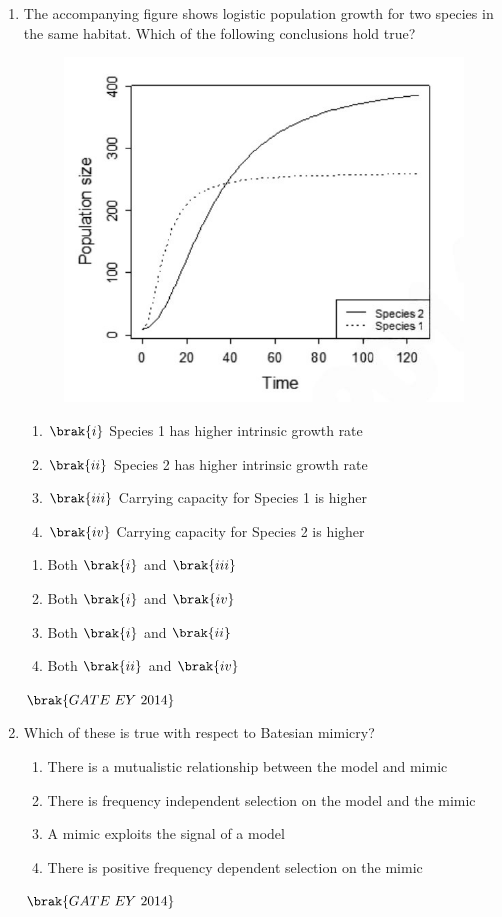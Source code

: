 \documentclass[journal]{IEEEtran}
\numberwithin{equation}{enumi}
\numberwithin{figure}{enumi}
\begin{document}
\begin{enumerate}
    \item The accompanying figure shows logistic population growth for two species in the same habitat. Which of the following conclusions hold true?
    \begin{figure}[H]
    \centering
    \includegraphics[width=0.7\columnwidth]{figs/12.png}
    \caption{}
    \label{fig:12}
   \end{figure}
    \begin{enumerate}
        \item $\brak{i}$ Species 1 has higher intrinsic growth rate
        \item $\brak{ii}$ Species 2 has higher intrinsic growth rate
        \item $\brak{iii}$ Carrying capacity for Species 1 is higher
        \item $\brak{iv}$ Carrying capacity for Species 2 is higher
    \end{enumerate}
    \begin{multicols}{2}
    \begin{enumerate}
        \item Both $\brak{i}$ and $\brak{iii}$
        \item Both $\brak{i}$ and $\brak{iv}$
        \item Both $\brak{i}$ and $\brak{ii}$
        \item Both $\brak{ii}$ and $\brak{iv}$
    \end{enumerate}
    \end{multicols}
    \hfill{$\brak{ GATE\ EY\ 2014}$}
    \bigskip

    \item Which of these is true with respect to Batesian mimicry?
    \begin{enumerate}
        \item There is a mutualistic relationship between the model and mimic
        \item There is frequency independent selection on the model and the mimic
        \item A mimic exploits the signal of a model
        \item There is positive frequency dependent selection on the mimic
    \end{enumerate}
    \hfill{$\brak{ GATE\ EY\ 2014}$}
    \bigskip


\end{enumerate}
\end{document}
